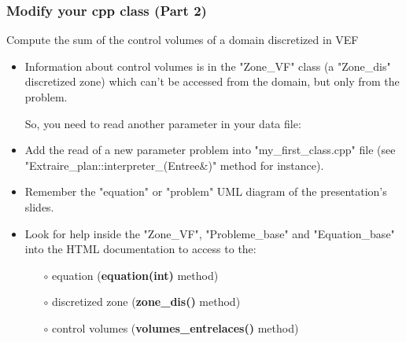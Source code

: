\documentclass[10pt, hyperref={unicode=true,pdfusetitle, bookmarks=true,bookmarksnumbered=false,bookmarksopen=false, breaklinks=false,pdfborder={0 0 1},backref=true,colorlinks=true,linkcolor=darkblue,pageanchor, urlcolor=darkblue}]{beamer}
\begin{document}
\begin{frame}
\frametitle{Modify your cpp class (Part 2)}
\begin{block}{Compute the sum of the control volumes of a domain discretized in VEF}
\begin{itemize}
\item Information about control volumes is in the "Zone\_VF" class (a "Zone\_dis" discretized zone) which can't be accessed 
from the domain, but only from the problem. 

So, you need to read another parameter in your data file:\\
\begin{center}
\end{center}

\item Add the read of a new parameter problem into "my\_first\_class.cpp" file (see "Extraire\_plan::interpreter\_(Entree\&)" method for instance).

\item Remember the "equation" or "problem" UML diagram of the presentation's slides.

\item Look for help inside the "Zone\_VF", "Probleme\_base" and "Equation\_base" into the HTML documentation to access to the:
    \begin{itemize}
    \item [$\circ$] equation (\textbf{equation(int)} method)
    \item [$\circ$] discretized zone (\textbf{zone\_dis()} method)
    \item [$\circ$] control volumes (\textbf{volumes\_entrelaces()} method)
    \end{itemize}
\end{itemize}

\end{block}
\end{frame}
\end{document}
